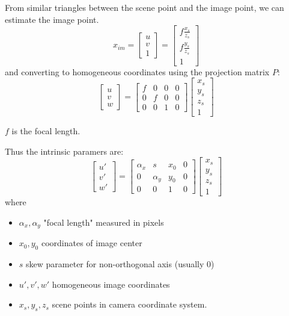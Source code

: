 \documentclass[a4paper]{article}
\begin{document}
From similar triangles between the scene point and the image point, we can estimate the image point.
\begin{equation}
	x_{im} = \begin{bmatrix}
	u \\
	v \\
	1
\end{bmatrix} = \begin{bmatrix}
f \frac{x_s}{z_s}  \\
f \frac{y_s}{z_s} \\
1
\end{bmatrix} 
\end{equation}
and converting to homogeneous coordinates using the projection matrix $ P $:
 \begin{equation}
\begin{bmatrix}
u \\
v \\
w
\end{bmatrix} = \begin{bmatrix}
f & 0 & 0 & 0 \\
0 & f & 0 & 0 \\
0 & 0 & 1 & 0
\end{bmatrix} \begin{bmatrix}
x_s \\
y_s \\
z_s \\
1
\end{bmatrix} 
\end{equation}

$ f $ is the focal length.


Thus the intrinsic paramers are:
 \begin{equation}
\begin{bmatrix}
u' \\
v' \\
w'
\end{bmatrix} = \begin{bmatrix}
\alpha_x  & s & x_0 & 0 \\
0 & \alpha_y & y_0 & 0 \\
0 & 0 & 1 & 0
\end{bmatrix} \begin{bmatrix}
x_s \\
y_s \\
z_s \\
1
\end{bmatrix} 
\end{equation}
where 
\begin{itemize}
	\item $ \alpha_x, \alpha_y $ "focal length" measured in pixels
	\item $ x_0, y_0 $ coordinates of image center
	\item $ s $ skew parameter for non-orthogonal axis (usually $ 0 $)
	\item $ u', v', w' $ homogeneous image coordinates
	\item $ x_s, y_s, z_s $ scene points in camera coordinate system.
\end{itemize}
\end{document}
